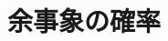 \documentclass[../../../topic_probability-statistics]{subfiles}
\begin{document}
\sectionline
\section{余事象の確率}

\todo{}
\end{document}
